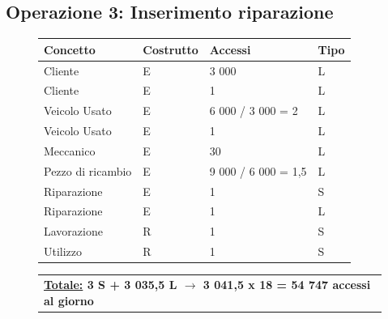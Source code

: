 \documentclass[a4paper,12pt]{report}
\begin{document}
\subsection*{Operazione 3: Inserimento riparazione}
\begin{figure}[H]
	\centering
	\begin{tabular}{L{3.7cm}C{2.2cm}C{4.7cm}C{2cm}}
		\rule[-2mm]{0mm}{0.6cm}{}
		\textbf{Concetto} & \textbf{Costrutto} &\textbf{Accessi} & \textbf{Tipo} \\
		\hline\rule[-2mm]{0mm}{0.65cm}{}
		Cliente & E & 3 000 & L \\
		\hline\rule[-2mm]{0mm}{0.65cm}{}
		Cliente & E & 1 & L \\
		\hline\rule[-2mm]{0mm}{0.65cm}{}
		Veicolo Usato & E & 6 000 / 3 000 = 2 & L \\
		\hline\rule[-2mm]{0mm}{0.65cm}{}
		Veicolo Usato & E & 1 & L \\
		\hline\rule[-2mm]{0mm}{0.65cm}{}
		Meccanico & E & 30 & L \\
		\hline\rule[-2mm]{0mm}{0.65cm}{}
		Pezzo di ricambio & E & 9 000 / 6 000 = 1,5 & L \\
		\hline\rule[-2mm]{0mm}{0.65cm}{}
		Riparazione & E & 1 & S \\
		\hline\rule[-2mm]{0mm}{0.65cm}{}
		Riparazione & E & 1 & L \\
		\hline\rule[-2mm]{0mm}{0.65cm}{}
		Lavorazione & R & 1 & S \\
		\hline\rule[-2mm]{0mm}{0.65cm}{}
		Utilizzo & R & 1 & S \\
	\end{tabular}
	
	\begin{tabular}{C{13.9cm}}
		\rule[-3mm]{0mm}{0.85cm}{}	
		 \textbf{\underline{Totale:} 3 S +  3 035,5 L $\to$ 3 041,5 x 18 = 54 747 accessi al giorno}
	\end{tabular}
\end{figure}

\newpage
\end{document}
